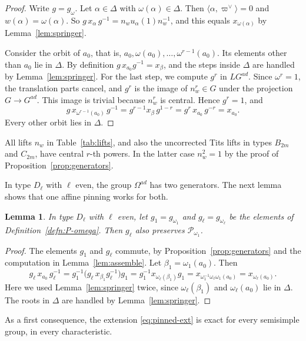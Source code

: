 \documentclass[psamsfonts]{amsart}
\newtheorem{lem}[thm]{Lemma}
\theoremstyle{definition}
\theoremstyle{remark}
\numberwithin{equation}{section}
\newcommand{\ra}{\rightarrow}
\newcommand\cP{\mathcal{P}}
\numberwithin{equation}{section}
\newcommand{\om}{\omega}
\newcommand{\Om}{\Omega}
\theoremstyle{plain}
\begin{document}
\begin{proof}
Write $g=g_\om$. Let $\alpha\in\Delta$ with $\om(\alpha)\in\Delta$. Then $\langle\alpha,\varpi^\vee\rangle=0$ and $w(\alpha)=\om(\alpha)$. So $g\,x_\alpha\,g^{-1}=n_wu_\alpha(1)n_w^{-1}$, and this equals $x_{\om(\alpha)}$ by Lemma~\ref{lem:springer}.

Consider the orbit of $a_0$, that is, $a_0,\om(a_0),\dots,\om^{r-1}(a_0)$. Its elements other than $a_0$ lie in $\Delta$. By definition $g\,x_{a_0}g^{-1}=x_\beta$, and the steps inside $\Delta$ are handled by Lemma~\ref{lem:springer}. For the last step, we compute $g^r$ in $LG^{ad}$. Since $\om^r=1$, the translation parts cancel, and $g^r$ is the image of $n_w^r\in G$ under the projection $G\ra G^{ad}$. This image is trivial because $n_w^r$ is central. Hence $g^r=1$, and
\[
g\,x_{\om^{r-1}(a_0)}\,g^{-1}=g^{r-1}x_\beta\,g^{1-r}=g^r\,x_{a_0}\,g^{-r}=x_{a_0}.
\]
Every other orbit lies in $\Delta$.
\end{proof}

All lifts $n_w$ in Table~\ref{tab:lifts}, and also the uncorrected Tits lifts in types $B_{2m}$ and $C_{2m}$, have central $r$-th powers. In the latter case $n_w^2=1$ by the proof of Proposition~\ref{prop:generators}.

In type $D_\ell$ with $\ell$ even, the group $\Om^{ad}$ has two generators. The next lemma shows that one affine pinning works for both.

\begin{lem}\label{lem:pinned-D}
In type $D_\ell$ with $\ell$ even, let $g_1=g_{\om_1}$ and $g_\ell=g_{\om_\ell}$ be the elements of Definition~\ref{defn:P-omega}. Then $g_\ell$ also preserves $\cP_{\om_1}$.
\end{lem}

\begin{proof}
The elements $g_1$ and $g_\ell$ commute, by Proposition~\ref{prop:generators} and the computation in Lemma~\ref{lem:assemble}. Let $\beta_1=\om_1(a_0)$. Then
\[
g_\ell\,x_{a_0}\,g_\ell^{-1}=g_1^{-1}\big(g_\ell\,x_{\beta_1}g_\ell^{-1}\big)g_1=g_1^{-1}x_{\om_\ell(\beta_1)}g_1=x_{\om_1^{-1}\om_\ell\om_1(a_0)}=x_{\om_\ell(a_0)}.
\]
Here we used Lemma~\ref{lem:springer} twice, since $\om_\ell(\beta_1)$ and $\om_\ell(a_0)$ lie in $\Delta$. The roots in $\Delta$ are handled by Lemma~\ref{lem:springer}.
\end{proof}

As a first consequence, the extension \eqref{eq:pinned-ext} is exact for every semisimple group, in every characteristic.
\end{document}
